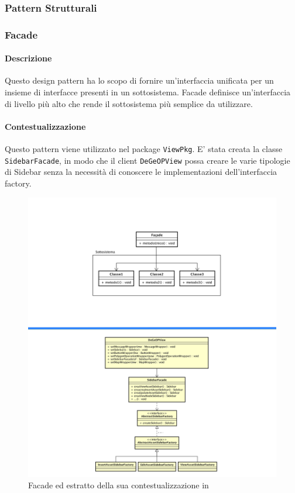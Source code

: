 \newpage
\subsubsection{Pattern Strutturali}
\subsubsection{Facade}
\paragraph{Descrizione}
Questo design pattern ha lo scopo di fornire un'interfaccia unificata per un insieme di interfacce presenti in un sottosistema. Facade definisce un'interfaccia di livello più alto che rende il sottosistema più semplice da utilizzare.
\paragraph{Contestualizzazione}
Questo pattern viene utilizzato nel package \texttt{ViewPkg}. E' stata creata la classe \texttt{SidebarFacade}, in modo che il client \texttt{DeGeOPView} possa creare le varie tipologie di Sidebar senza la necessità di conoscere le implementazioni dell'interfaccia factory.
	\begin{figure}[H]
		\label{builder_compara}
		\centering
		\includegraphics[scale=0.15]{img/facadeComparati.png}
		\caption{Facade ed estratto della sua contestualizzazione in \progetto}
	\end{figure}


